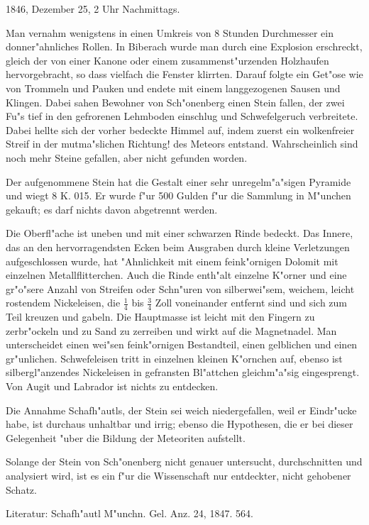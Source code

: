 \documentclass[a4paper, 11pt, oneside]{article}
\begin{document}
1846, Dezember 25, 2 Uhr Nachmittags.

Man vernahm wenigstens in einen Umkreis von 8 Stunden Durchmesser ein donner"ahnliches Rollen. In Biberach wurde man durch eine Explosion erschreckt, gleich der von einer Kanone oder einem zusammenst"urzenden Holzhaufen hervorgebracht, so dass vielfach die Fenster klirrten. Darauf folgte ein Get"ose wie von Trommeln und Pauken und endete mit einem langgezogenen Sausen und Klingen. Dabei sahen Bewohner von Sch"onenberg einen Stein fallen, der zwei Fu"s tief in den gefrorenen Lehmboden einschlug und Schwefelgeruch verbreitete. Dabei hellte sich der vorher bedeckte Himmel auf, indem zuerst ein wolkenfreier Streif in der mutma"slichen Richtung! des Meteors entstand. Wahrscheinlich sind noch mehr Steine gefallen, aber nicht gefunden worden.

Der aufgenommene Stein hat die Gestalt einer sehr unregelm"a"sigen Pyramide und wiegt 8 K. 015. Er wurde f"ur 500 Gulden f"ur die Sammlung in M"unchen gekauft; es darf nichts davon abgetrennt werden.

Die Oberfl"ache ist uneben und mit einer schwarzen Rinde bedeckt. Das Innere, das an den hervorragendsten Ecken beim Ausgraben durch kleine Verletzungen aufgeschlossen wurde, hat "Ahnlichkeit mit einem feink"ornigen Dolomit mit einzelnen Metallflitterchen. Auch die Rinde enth"alt einzelne K"orner und eine gr"o"sere Anzahl von Streifen oder Schn"uren von silberwei"sem, weichem, leicht rostendem Nickeleisen, die $\frac{1}{4}$ bis $\frac{3}{4}$ Zoll voneinander entfernt sind und sich zum Teil kreuzen und gabeln. Die Hauptmasse ist leicht mit den Fingern zu zerbr"ockeln und zu Sand zu zerreiben und wirkt auf die Magnetnadel. Man unterscheidet einen wei"sen feink"ornigen Bestandteil, einen gelblichen und einen gr"unlichen. Schwefeleisen tritt in einzelnen kleinen K"ornchen auf, ebenso ist silbergl"anzendes Nickeleisen in gefransten Bl"attchen gleichm"a"sig eingesprengt. Von Augit und Labrador ist nichts zu entdecken.

Die Annahme Schafh"autls, der Stein sei weich niedergefallen, weil er Eindr"ucke habe, ist durchaus unhaltbar und irrig; ebenso die Hypothesen, die er bei dieser Gelegenheit "uber die Bildung der Meteoriten aufstellt.

Solange der Stein von Sch"onenberg nicht genauer untersucht, durchschnitten und analysiert wird, ist es ein f"ur die Wissenschaft nur entdeckter, nicht gehobener Schatz.

\footnotesize
Literatur: Schafh"autl M"unchn. Gel. Anz. 24, 1847. 564.
\end{document}
